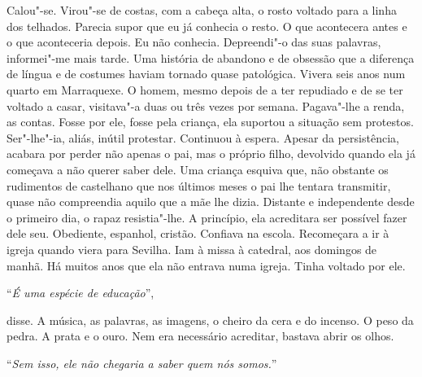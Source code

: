 Calou"-se. Virou"-se de costas, com a cabeça alta, o rosto voltado para
a linha dos telhados. Parecia supor que eu já conhecia o resto. O que
acontecera antes e o que aconteceria depois. Eu não conhecia.
Depreendi"-o das suas palavras, informei"-me mais tarde. Uma história de
abandono e de obsessão que a diferença de língua e de costumes haviam
tornado quase patológica. Vivera seis anos num quarto em Marraquexe. O
homem, mesmo depois de a ter repudiado e de se ter voltado a casar,
visitava"-a duas ou três vezes por semana. Pagava"-lhe a renda, as
contas. Fosse por ele, fosse pela criança, ela suportou a situação sem
protestos. Ser"-lhe"-ia, aliás, inútil protestar. Continuou à espera.
Apesar da persistência, acabara por perder não apenas o pai, mas o
próprio filho, devolvido quando ela já começava a não querer saber dele.
Uma criança esquiva que, não obstante os rudimentos de castelhano que
nos últimos meses o pai lhe tentara transmitir, quase não compreendia
aquilo que a mãe lhe dizia. Distante e independente desde o primeiro
dia, o rapaz resistia"-lhe. A princípio, ela acreditara ser possível
fazer dele seu. Obediente, espanhol, cristão. Confiava na escola.
Recomeçara a ir à igreja quando viera para Sevilha. Iam à missa à
catedral, aos domingos de manhã. Há muitos anos que ela não entrava numa
igreja. Tinha voltado por ele.

``\emph{É uma espécie de educação}'',

disse. A música, as palavras, as imagens, o cheiro da cera e do incenso.
O peso da pedra. A prata e o ouro. Nem era necessário acreditar, bastava
abrir os olhos.

``\emph{Sem isso, ele não chegaria a saber quem nós somos.}''

